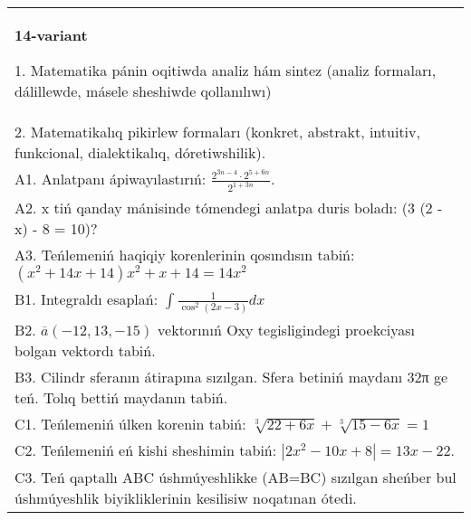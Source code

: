 \documentclass{article}
\begin{document}
\begin{tabular}{m{17cm}}
\textbf{14-variant}

1. Matematika pánin oqitiwda analiz hám sintez (analiz formaları, dálillewde, másele sheshiwde qollanılıwı) \\
2. Matematikalıq pikirlew formaları (konkret, abstrakt, intuitiv, funkcional, dialektikalıq, dóretiwshilik). \\
A1. Anlatpanı ápiwayılastırıń: \(\frac{2^{3n - 4} \cdot 2^{5 + 6n}}{2^{1 + 3n}}\). \\
A2. x tiń qanday mánisinde tómendegi anlatpa duris boladı: (3 (2 - x) - 8 = 10)? \\
A3. Teńlemeniń haqiqiy korenlerinin qosındısın tabiń: \((x^2 + 14x + 14) x^2 + x + 14 = 14x^2\) \\
B1. Integraldı esaplań: \(\int_{}^{}{\frac{1}{\cos^{2} (2x - 3) }dx}\) \\
B2. \(\overline{a} (- 12,13, - 15) \) vektorınıń Oxy tegisligindegi proekciyası bolgan vektordı tabiń. \\
B3. Cilindr sferanın átirapına sızılgan. Sfera betiniń maydanı 32π ge teń. Tolıq bettiń maydanın tabiń. \\
C1. Teńlemeniń úlken korenin tabiń: \(\sqrt[3]{22 + 6x} + \sqrt[3]{15 - 6x} = 1\) \\
C2. Teńlemeniń eń kishi sheshimin tabiń: \(\left| 2x^2 - 10x + 8 \right| = 13x - 22\). \\
C3. Teń qaptallı ABC úshmúyeshlikke (AB=BC) sızılgan sheńber bul úshmúyeshlik biyikliklerinin kesilisiw noqatınan ótedi. \\

\end{tabular}
\vspace{1cm}
\end{document}
